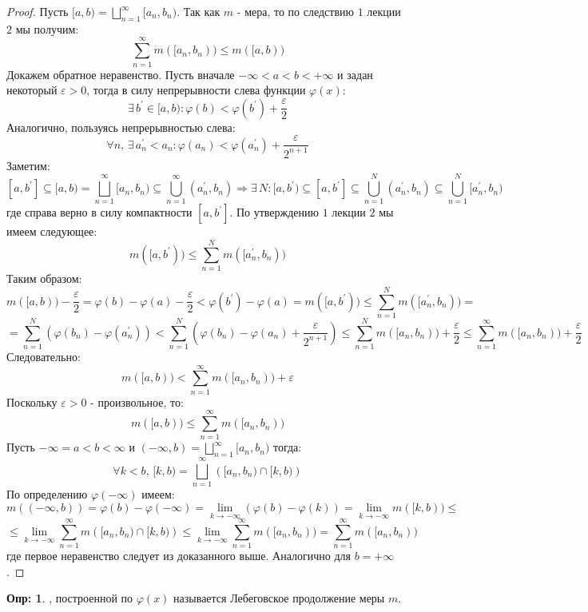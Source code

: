 \documentclass[12pt]{article}
\newcommand{\VE}{\varepsilon}
\theoremstyle{definition}
\newtheorem{defn}{Опр:}
\begin{document}
\begin{proof}
	Пусть $[a,b) = \bigsqcup\limits_{n = 1}^{\infty}[a_n, b_n)$. Так как $m$ - мера, то по следствию $1$ лекции $2$ мы получим:
	$$
		\sum\limits_{n = 1}^{\infty}m([a_n, b_n)) \leq m([a,b))
	$$
	Докажем обратное неравенство. Пусть вначале $- \infty < a <b < + \infty$ и задан некоторый $\VE > 0$, тогда в силу непрерывности слева функции $\varphi(x)$: 
	$$
		\exists \, b^\prime \in [a,b) \colon \varphi(b) < \varphi(b^\prime) + \dfrac{\VE}{2}
	$$
	Аналогично, пользуясь непрерывностью слева:
	$$
		\forall n, \, \exists \, a_n^\prime < a_n \colon \varphi(a_n) < \varphi(a_n^\prime) + \dfrac{\VE}{2^{n+1}}	
	$$
	Заметим: 
	$$
		[a,b^\prime] \subseteq [a,b) = \displaystyle \bigsqcup\limits_{n = 1}^{\infty}[a_n, b_n) \subseteq \bigcup\limits_{n = 1}^{\infty}(a_n^\prime, b_n) \Rightarrow \exists \, N \colon [a,b^\prime) \subseteq [a,b^\prime] \subseteq \bigcup\limits_{n = 1}^{N}(a_n^\prime, b_n)\subseteq \bigcup\limits_{n = 1}^{N}[a_n^\prime, b_n)
	$$
	где справа верно в силу компактности $[a,b^\prime]$. По утверждению $1$ лекции $2$ мы имеем следующее:
	$$
		m([a,b^\prime)) \leq \sum\limits_{n = 1}^N m([a_n^\prime, b_n))
	$$
	Таким образом:
	$$
		m([a,b)) - \dfrac{\VE}{2} = \varphi(b) - \varphi(a) - \dfrac{\VE}{2} < \varphi(b^\prime) - \varphi(a) = m([a,b^\prime)) \leq \sum\limits_{n = 1}^N m([a_n^\prime, b_n)) =
	$$
	$$
		= \sum\limits_{n = 1}^N (\varphi(b_n) - \varphi(a_n^\prime)) < \sum\limits_{n = 1}^N (\varphi(b_n) - \varphi(a_n) + \dfrac{\VE}{2^{n+1}}) \leq \sum\limits_{n = 1}^N m([a_n,b_n)) + \dfrac{\VE}{2} \leq \sum\limits_{n = 1}^{\infty} m([a_n,b_n)) + \dfrac{\VE}{2}
	$$
	Следовательно:
	$$
		m([a,b)) < \sum\limits_{n = 1}^{\infty} m([a_n,b_n)) + \VE
	$$
	Поскольку $\VE > 0$ - произвольное, то:
	$$
		m([a,b)) \leq \sum\limits_{n = 1}^{\infty} m([a_n,b_n))
	$$
	Пусть $ -\infty = a < b < \infty$ и $(-\infty,b) = \bigsqcup\limits_{n = 1}^{\infty}[a_n, b_n)$ тогда:
	$$
		\forall k < b, \, [k,b) = \bigsqcup\limits_{n = 1}^{\infty}\left([a_n, b_n) \cap [k,b) \right)
	$$
	По определению $\varphi(-\infty)$ имеем: 
	$$
		m((-\infty,b)) = \varphi(b) - \varphi(-\infty) = \lim\limits_{k \to -\infty}\left(\varphi(b) - \varphi(k)\right) = \lim\limits_{k \to -\infty}m([k,b)) \leq 
	$$
	$$
		\leq \lim\limits_{k \to -\infty} \sum\limits_{n = 1}^{\infty}m\left([a_n, b_n) \cap [k,b) \right) \leq \lim\limits_{k \to -\infty} \sum\limits_{n = 1}^{\infty}m([a_n,b_n)) = \sum\limits_{n = 1}^{\infty}m([a_n,b_n))
	$$
	где первое неравенство следует из доказанного выше. Аналогично для $b = +\infty$.
\end{proof}

\begin{defn}
	, построенной по $\varphi(x)$ называется Лебеговское продолжение меры $m$.
\end{defn}
\end{document}
